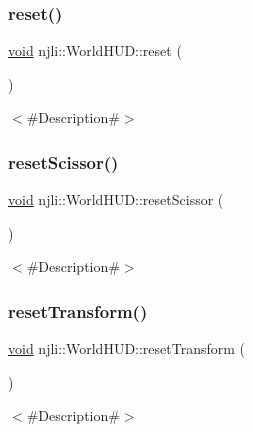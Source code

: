 \subsubsection{\texorpdfstring{reset()}{reset()}}
{\footnotesize\ttfamily \mbox{\hyperlink{_thread_8h_af1e856da2e658414cb2456cb6f7ebc66}{void}} njli\+::\+World\+H\+U\+D\+::reset (\begin{DoxyParamCaption}{ }\end{DoxyParamCaption})}

$<$\#\+Description\#$>$ \mbox{\label{classnjli_1_1_world_h_u_d_a1510b2540e17040abc985f2b3485ea71}} 
\subsubsection{\texorpdfstring{reset\+Scissor()}{resetScissor()}}
{\footnotesize\ttfamily \mbox{\hyperlink{_thread_8h_af1e856da2e658414cb2456cb6f7ebc66}{void}} njli\+::\+World\+H\+U\+D\+::reset\+Scissor (\begin{DoxyParamCaption}{ }\end{DoxyParamCaption})}

$<$\#\+Description\#$>$ \mbox{\label{classnjli_1_1_world_h_u_d_a7f21364c34dbacfbf206e440c4774dd1}} 
\subsubsection{\texorpdfstring{reset\+Transform()}{resetTransform()}}
{\footnotesize\ttfamily \mbox{\hyperlink{_thread_8h_af1e856da2e658414cb2456cb6f7ebc66}{void}} njli\+::\+World\+H\+U\+D\+::reset\+Transform (\begin{DoxyParamCaption}{ }\end{DoxyParamCaption})}

$<$\#\+Description\#$>$ \mbox{\label{classnjli_1_1_world_h_u_d_a9eb79412a9e58ed635026ea42ce3b56e}} 
